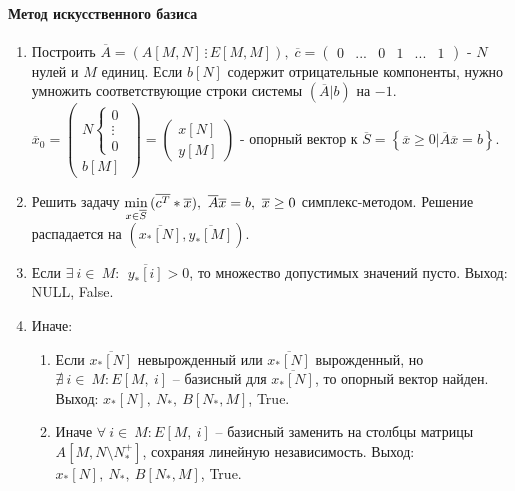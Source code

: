 \documentclass{article}
\begin{document}
\paragraph{Метод искусственного базиса}
\begin{enumerate}
    \item Построить $\overline{A}=(A[M,N]\,\vdots\, E[M,M]),\; \overline{c}=\begin{pmatrix}0&...&0&1&...&1\end{pmatrix}$ - $N$ нулей и $M$ единиц. Если $b[N]$ содержит отрицательные компоненты, нужно умножить соответствующие строки системы $(\overline{A}|b)$ на $-1$. $\overline{x}_0=\begin{pmatrix}N\begin{cases}0\\\vdots\\0\end{cases}\\b[M]\end{pmatrix}=\begin{pmatrix}x[N]\\y[M]\end{pmatrix}$ - опорный вектор к $\overline{S}=\left\{\overline{x}\geq0|\overline{A}\overline{x}=b\right\}$.
    \item Решить задачу $\displaystyle\min\displaylimits_{x\in\overline{S}}{(\overline{c^T}}\ast\overline{x}),\ \overline{ A}\overline{x}=b,\ \overline{x}\geq0$ симплекс-методом. Решение распадается на $(\overline{x_\ast\left[N\right]},\overline{y_\ast\left[M\right]})$.
    \item 	Если $\exists\ i\in\ M:\ \ \overline{y_\ast\left[i\right]}>0$, то множество допустимых значений пусто. Выход: NULL, False.
    \item Иначе: {
    \begin{enumerate}
        \item Если $\overline{x_\ast\left[N\right]}$ невырожденный или  $\overline{x_\ast\left[N\right]}$ вырожденный, но $\nexists\ i\in\ M:E[M,\ i]$ – базисный для $\overline{x_\ast\left[N\right]}$, то опорный вектор найден. Выход: $x_\ast\left[N\right],\ N_\ast,\ B\left[N_\ast,M\right]$, True.
        \item Иначе $\forall\ i\in\ M:E[M,\ i]$ – базисный заменить на столбцы матрицы $A\left[M,N\setminus N_\ast^+\right]$, сохраняя линейную независимость. Выход: $x_\ast\left[N\right],\ N_\ast,\ B\left[N_\ast,M\right]$, True.
    \end{enumerate}
    }
\end{enumerate}
\end{document}
